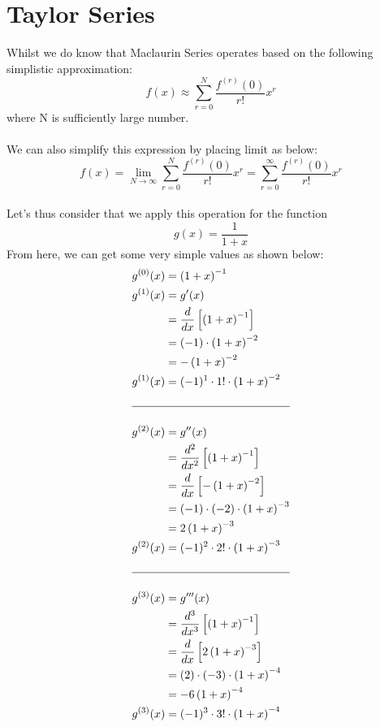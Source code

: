 \documentclass[a4paper,12pt,oneside]{book}
\begin{document}
\chapter{Taylor Series}
Whilst we do know that Maclaurin Series operates based on the following simplistic approximation:
\[ f(x) \approx \sum_{r = 0}^{N} \frac{f^{(r)}(0)}{r!} x^r \] where N is sufficiently large number.\\\\
We can also simplify this expression by placing limit as below:
\[ f(x) = \lim_{N\to\infty} \sum_{r = 0}^{N} \frac{f^{(r)}(0)}{r!} x^r = \sum_{r = 0}^{\infty} \frac{f^{(r)}(0)}{r!} x^r \]
\\
Let's thus consider that we apply this operation for the function \[ g(x) = \frac{1}{1+x} \]
From here, we can get some very simple values as shown below:
\begin{align*}
g^{(0)}(x) &= \left ( 1 + x \right )^{-1} \\
g^{(1)}(x) &= g'(x) \\
&= \frac{d}{dx} \left [ \left ( 1 + x \right )^{-1} \right ] \\
&= (-1) \cdot \left ( 1 + x \right )^{-2} \\
&= - \left ( 1 + x \right )^{-2} \\
g^{(1)}(x) &= (-1)^{1} \cdot 1! \cdot \left ( 1 + x \right )^{-2} \\\\
\hline \\
g^{(2)}(x) &= g''(x) \\
&= \frac{d^2}{dx^2} \left [ \left ( 1 + x \right )^{-1} \right ] \\
&= \frac{d}{dx} \left [ - \left ( 1 + x \right )^{-2} \right ] \\
&= (-1) \cdot (-2) \cdot \left ( 1 + x \right )^{-3} \\
&= 2 \left ( 1 + x \right )^{-3} \\
g^{(2)}(x) &= (-1)^{2} \cdot 2! \cdot \left ( 1 + x \right )^{-3} \\\\
\hline \\
g^{(3)}(x) &= g'''(x) \\
&= \frac{d^3}{dx^3} \left [ \left ( 1 + x \right )^{-1} \right ] \\
&= \frac{d}{dx} \left [ 2 \left ( 1 + x \right )^{-3} \right ] \\
&= (2) \cdot (-3) \cdot \left ( 1 + x \right )^{-4} \\
&= - 6 \left ( 1 + x \right )^{-4} \\
g^{(3)}(x) &= (-1)^{3} \cdot 3! \cdot \left ( 1 + x \right )^{-4} \\
\end{align*}
\end{document}
